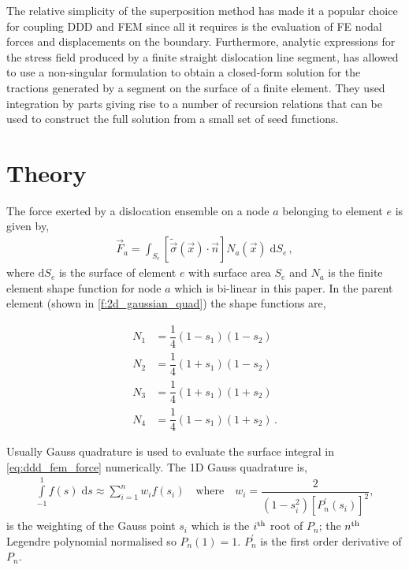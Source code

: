 \documentclass[11pt]{iopart}
\begin{document}
The relative simplicity of the superposition method has made it a popular choice for coupling DDD and FEM since all it requires is the evaluation of FE nodal forces and displacements on the boundary. Furthermore, analytic expressions for the stress field produced by a finite straight dislocation line segment, has allowed \citet{Queyreau} to use a non-singular formulation to obtain a closed-form solution for the tractions generated by a segment on the surface of a finite element. They used integration by parts giving rise to a number of recursion relations that can be used to construct the full solution from a small set of seed functions.

\section{Theory}\label{s:theory}

The force exerted by a dislocation ensemble on a node $a$ belonging to element $e$ is given by,
%
\begin{align}
    \vec{F}_{a} = \int_{S_{e}} \left[\tilde{\vec{\sigma}}(\vec{x}) \cdot \vec{n}\right] N_{a}(\vec{x})\; \mathrm{d}S_{e}\,,
    \label{eq:ddd_fem_force}
\end{align}
%
where $\mathrm{d}S_{e}$ is the surface of element $e$ with surface area $S_{e}$ and $N_{a}$ is the finite element shape function for node $a$ which is bi-linear in this paper. In the parent element (shown in \cref{f:2d_gaussian_quad}) the shape functions are,

\begin{align}
    \label{eq:shape_function}
    N_{1} & = \dfrac{1}{4}(1-s_1)(1-s_2)             \\
    N_{2} & = \dfrac{1}{4}(1+s_1)(1-s_2)\nonumber    \\
    N_{3} & = \dfrac{1}{4}(1+s_1)(1+s_2)\nonumber    \\
    N_{4} & = \dfrac{1}{4}(1-s_1)(1+s_2)\nonumber\,.
\end{align}

Usually Gauss quadrature is used to evaluate the surface integral in \cref{eq:ddd_fem_force} numerically. The 1D Gauss quadrature is,
%
\begin{align}
    \label{eq:gauss_leg}
    \int\limits_{-1}^{1} f(s)\;\mathrm{d}s \approx \sum\limits_{i=1}^{n} w_{i} f(s_{i}) \quad \textrm{where}\quad
    w_{i} = \dfrac{2}{\left(1-s_{i}^{2}\right) \left[P_{n}^{'}\left(s_{i}\right)\right]^{2}},
\end{align}
%
is the weighting of the Gauss point $s_{i}$ which is the $i\textsuperscript{th}$ root of $P_{n}$; the $n\textsuperscript{th}$ Legendre polynomial normalised so $P_{n}(1) = 1$. $P_{n}^{'}$ is the first order derivative of $P_{n}$.
\end{document}
